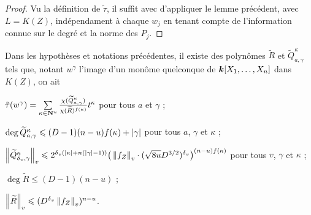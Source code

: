 \begin{proof}
  Vu la définition de $\tilde\tau$, il suffit avec d'appliquer le lemme
  précédent, avec $L = K(Z)$, indépendament à chaque $w_j$ en tenant compte de
  l'information connue sur le degré et la norme des $P_j$.
\end{proof}

\begin{lem}
  Dans les hypothèses et notations précédentes, il existe des polynômes
  $\widetilde R$ et $\widetilde Q_{a, \gamma}^\kappa$ tels que, notant
  $w^\gamma$ l'image d'un monôme quelconque de $\boldsymbol{k}[X_1, \ldots, X_n]$ dans
  $K(Z)$, on ait
  \begin{enumthm}
    \item $\tilde\tau(w^\gamma) = \sum\limits_{\kappa\in\mathbf{N}^u}
      \frac
        {\chi(\widetilde Q_{a, \gamma}^\kappa)}
        {\chi(\widetilde R)^{f(\kappa)}}
      t^\kappa$ pour tous $a$ et $\gamma$ ;
    \item $\deg \widetilde Q_{a, \gamma}^\kappa \leqslant (D-1)(n-u)f(\kappa) +
      {\lvert\gamma\rvert}$ pour tous $a$, $\gamma$ et $\kappa$ ;
    \item $\left\lVert\widetilde Q_{{\delta\smash{_v}}, \gamma}^\kappa\right\rVert_{v} \leqslant 2^{{\delta\smash{_v}}({\lvert\kappa\rvert} +
        n({\lvert\gamma\rvert} -1))} \big( \left\lVert f_Z\right\rVert_{v} \cdot (\sqrt{8u} D^{3/2})^{\delta\smash{_v}}
      \big)^{(n-u)f(\kappa)}$ pour tous $v$, $\gamma$ et $\kappa$ ;
    \item $\deg{\widetilde R} \le (D-1)(n-u)$ ;
    \item $\left\lVert\widetilde R\right\rVert_{v} \leqslant (D^{\delta\smash{_v}} \left\lVert f_Z\right\rVert_{v})^{n-u}$.
  \end{enumthm}
\end{lem}

